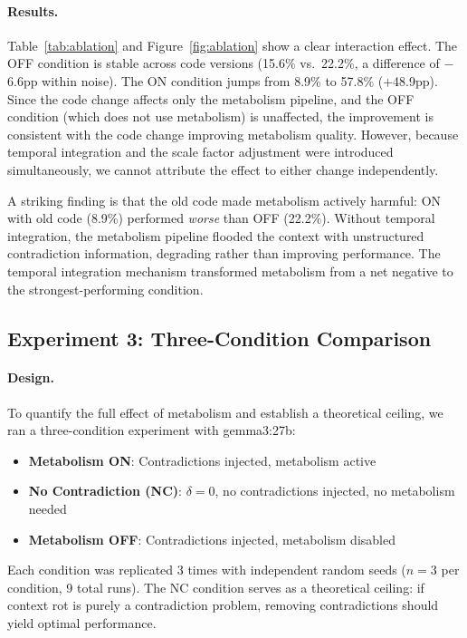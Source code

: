\documentclass[11pt,a4paper]{article}
\begin{document}
\paragraph{Results.}
Table~\ref{tab:ablation} and Figure~\ref{fig:ablation} show a clear interaction effect.
The OFF condition is stable across code versions (15.6\% vs.\ 22.2\%, a difference of $-$6.6pp within noise).
The ON condition jumps from 8.9\% to 57.8\% ($+$48.9pp).
Since the code change affects only the metabolism pipeline, and the OFF condition (which does not use metabolism) is unaffected, the improvement is consistent with the code change improving metabolism quality.
However, because temporal integration and the scale factor adjustment were introduced simultaneously, we cannot attribute the effect to either change independently.

A striking finding is that the old code made metabolism actively harmful: ON with old code (8.9\%) performed \emph{worse} than OFF (22.2\%).
Without temporal integration, the metabolism pipeline flooded the context with unstructured contradiction information, degrading rather than improving performance.
The temporal integration mechanism transformed metabolism from a net negative to the strongest-performing condition.

\subsection{Experiment 3: Three-Condition Comparison}
\label{sec:exp-threecond}

\paragraph{Design.}
To quantify the full effect of metabolism and establish a theoretical ceiling, we ran a three-condition experiment with gemma3:27b:
\begin{itemize}\item \textbf{Metabolism ON}: Contradictions injected, metabolism active
\item \textbf{No Contradiction (NC)}: $\delta = 0$, no contradictions injected, no metabolism needed
\item \textbf{Metabolism OFF}: Contradictions injected, metabolism disabled
\end{itemize}

Each condition was replicated 3 times with independent random seeds ($n = 3$ per condition, 9 total runs).
The NC condition serves as a theoretical ceiling: if context rot is purely a contradiction problem, removing contradictions should yield optimal performance.
\end{document}
